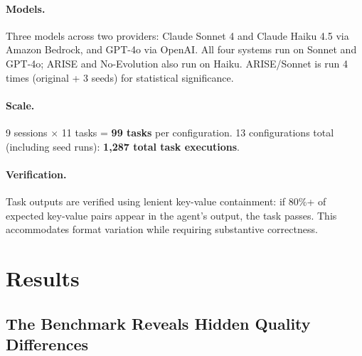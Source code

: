 \documentclass[10pt,twocolumn]{article}
\begin{document}
\paragraph{Models.} Three models across two providers: Claude Sonnet 4 and Claude Haiku 4.5 via Amazon Bedrock, and GPT-4o via OpenAI. All four systems run on Sonnet and GPT-4o; ARISE and No-Evolution also run on Haiku. ARISE/Sonnet is run 4 times (original + 3 seeds) for statistical significance.

\paragraph{Scale.} 9 sessions $\times$ 11 tasks = \textbf{99 tasks} per configuration. 13 configurations total (including seed runs): \textbf{1,287 total task executions}.

\paragraph{Verification.} Task outputs are verified using lenient key-value containment: if 80\%+ of expected key-value pairs appear in the agent's output, the task passes. This accommodates format variation while requiring substantive correctness.

\section{Results}

\subsection{The Benchmark Reveals Hidden Quality Differences}
\end{document}
